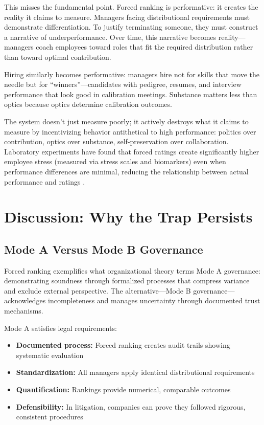 \documentclass[12pt]{article}
\begin{document}
This misses the fundamental point. Forced ranking is performative: it creates the reality it claims to measure. Managers facing distributional requirements must demonstrate differentiation. To justify terminating someone, they must construct a narrative of underperformance. Over time, this narrative becomes reality---managers coach employees toward roles that fit the required distribution rather than toward optimal contribution.

Hiring similarly becomes performative: managers hire not for skills that move the needle but for ``winners''---candidates with pedigree, resumes, and interview performance that look good in calibration meetings. Substance matters less than optics because optics determine calibration outcomes.

The system doesn't just measure poorly; it actively destroys what it claims to measure by incentivizing behavior antithetical to high performance: politics over contribution, optics over substance, self-preservation over collaboration. Laboratory experiments have found that forced ratings create significantly higher employee stress (measured via stress scales and biomarkers) even when performance differences are minimal, reducing the relationship between actual performance and ratings \citep{cardinaels2021forced}.

\section{Discussion: Why the Trap Persists}

\subsection{Mode A Versus Mode B Governance}

Forced ranking exemplifies what organizational theory terms Mode A governance: demonstrating soundness through formalized processes that compress variance and exclude external perspective. The alternative---Mode B governance---acknowledges incompleteness and manages uncertainty through documented trust mechanisms.

Mode A satisfies legal requirements:
\begin{itemize}
\item \textbf{Documented process:} Forced ranking creates audit trails showing systematic evaluation
\item \textbf{Standardization:} All managers apply identical distributional requirements
\item \textbf{Quantification:} Rankings provide numerical, comparable outcomes
\item \textbf{Defensibility:} In litigation, companies can prove they followed rigorous, consistent procedures \citep{badawi2023business}
\end{itemize}
\end{document}
